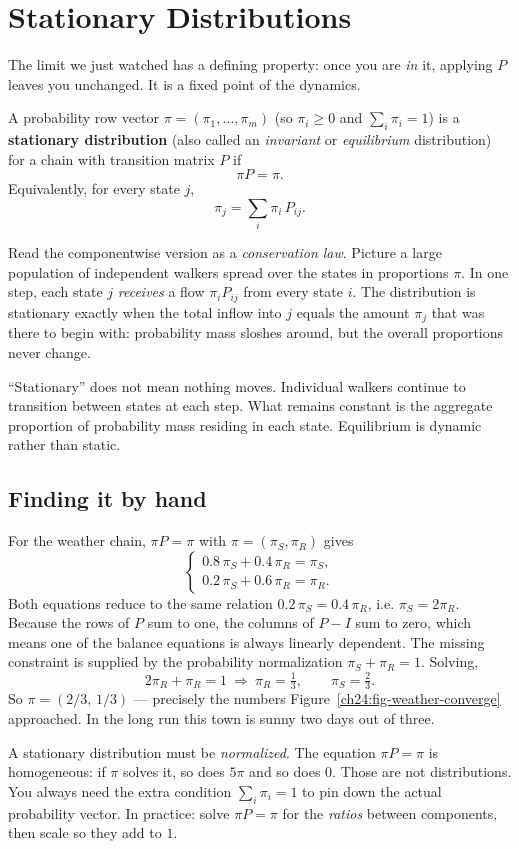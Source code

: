 \section{Stationary Distributions}
\label{ch24:stationary}
The limit we just watched has a defining property: once you are \emph{in} it,
applying $P$ leaves you unchanged. It is a fixed point of the dynamics.
\begin{definition}
\label{ch24:def-stationary}
A probability row vector $\pi = (\pi_1,\dots,\pi_m)$ (so $\pi_i \ge 0$ and
$\sum_i \pi_i = 1$) is a \textbf{stationary distribution} (also called an
\emph{invariant} or \emph{equilibrium} distribution) for a chain with transition
matrix $P$ if
\[
  \pi P = \pi.
\]
Equivalently, for every state $j$,
\[
  \pi_j = \sum_i \pi_i\,P_{ij}.
\]
\end{definition}
Read the componentwise version as a \emph{conservation law}. Picture a large
population of independent walkers spread over the states in proportions $\pi$.
In one step, each state $j$ \emph{receives} a flow $\pi_i P_{ij}$ from every state
$i$. The distribution is stationary exactly when the total inflow into $j$ equals
the amount $\pi_j$ that was there to begin with: probability mass sloshes around,
but the overall proportions never change.
\begin{intuitionbox}
``Stationary'' does not mean nothing moves. Individual walkers continue to transition
between states at each step. What remains constant is the aggregate proportion of probability
mass residing in each state. Equilibrium is dynamic rather than static.
\end{intuitionbox}
\subsection{Finding it by hand}
For the weather chain, $\pi P = \pi$ with $\pi = (\pi_S, \pi_R)$ gives
\[
  \begin{cases}
    0.8\,\pi_S + 0.4\,\pi_R = \pi_S,\\
    0.2\,\pi_S + 0.6\,\pi_R = \pi_R.
  \end{cases}
\]
Both equations reduce to the same relation $0.2\,\pi_S = 0.4\,\pi_R$, i.e.
$\pi_S = 2\pi_R$. Because the rows of $P$ sum to one, the
columns of $P - I$ sum to zero, which means one of the balance equations is always
linearly dependent. The missing constraint is supplied by the probability normalization
$\pi_S + \pi_R = 1$. Solving,
\[
  2\pi_R + \pi_R = 1 \ \Rightarrow\ \pi_R = \tfrac13,\qquad \pi_S = \tfrac23.
\]
So $\pi = (2/3,\,1/3)$ --- precisely the numbers Figure~\ref{ch24:fig-weather-converge}
approached. In the long run this town is sunny two days out of three.
\begin{trapbox}
A stationary distribution must be \emph{normalized}. The equation $\pi P = \pi$ is
homogeneous: if $\pi$ solves it, so does $5\pi$ and so does $0$. Those are not
distributions. You always need the extra condition $\sum_i \pi_i = 1$ to pin down
the actual probability vector. In practice: solve $\pi P = \pi$ for the
\emph{ratios} between components, then scale so they add to $1$.
\end{trapbox}

